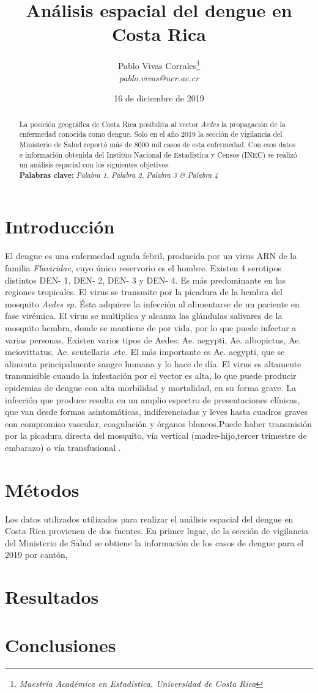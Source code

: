 \documentclass[12pt,a4paper]{article}
\author{Pablo Vivas Corrales\footnote{\textit{Maestría Académica en Estadística. Universidad de Costa Rica}}\\\textit{pablo.vivas@ucr.ac.cr}}
\title{Análisis espacial del dengue en Costa Rica}
\date{16 de diciembre de 2019}
\begin{document}
\maketitle
\begin{abstract}
\noindent
La posición geográfica de Costa Rica posibilita al vector \textit{Aedes} la propagación de la enfermedad conocida como dengue. Solo en el año 2019 la sección de vigilancia del Ministerio de Salud reportó más de 8000 mil casos de esta enfermedad. Con esos datos e información obtenida del Instituo Nacional de Estadistica y Censos (INEC) se realizó un análisis espacial con los siguientes objetivos: \\
\textbf{Palabras clave:} \textit{Palabra 1, Palabra 2, Palabra 3 \& Palabra 4} 
\end{abstract}
\section{Introducción}
El dengue es una enfermedad aguda febril, producida por un virus ARN de la familia
\textit{Flaviridae}, cuyo único reservorio es el hombre. Existen 4 serotipos distintos DEN- 1, DEN- 2, DEN- 3 y DEN- 4. Es más predominante en las regiones tropicales. El virus se transmite por la picadura de la hembra del mosquito \textit{Aedes sp.} Ésta adquiere la infección al alimentarse de un paciente en fase virémica. El virus se multiplica y alcanza las glándulas salivares de la mosquito hembra, donde se mantiene de por vida, por lo que puede infectar a varias personas. Existen varios tipos de Aedes: Ae. aegypti, Ae. albopictus, Ae. meiovittatus, Ae. scutellaris .etc. El más importante es Ae. aegypti, que se alimenta principalmente sangre humana y lo hace de día. El virus es altamente transmisible cuando la infestación por el vector es alta, lo que puede producir epidemias de dengue con alta morbilidad y mortalidad, en su forma grave. La infección que produce resulta en un amplio espectro de presentaciones clínicas, que van desde formas asintomáticas, indiferenciadas y leves hasta cuadros graves con compromiso vascular, coagulación y órganos blancos.Puede haber transmisión por la picadura directa del mosquito, vía vertical (madre-hijo,tercer trimestre de embarazo) o vía transfusional \cite{CajaCostarricensedelSeguroSocial2013}.
\section{Métodos}
Los datos utilizados utilizados para realizar el análisis espacial del dengue en Costa Rica provienen de dos fuentes. En primer lugar, de la sección de vigilancia del Ministerio de Salud se obtiene la información de los casos de dengue para el 2019 por cantón,  
\section{Resultados}
\section{Conclusiones}




\end{document}
